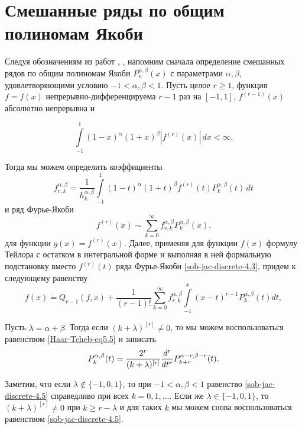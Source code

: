  \section{Смешанные ряды по общим полиномам Якоби}

 Следуя обозначениям из работ \cite{Haar-Tcheb-Shar13},   \cite{Haar-Tcheb-Shar18}, напомним сначала определение смешанных рядов по общим полиномам Якоби
 $P_n^{\alpha,\beta}(x)$ с параметрами $\alpha,\beta$, удовлетворяющими условию
$-1<\alpha,\beta<1$.  Пусть целое $r\ge1$, функция $f=f(x)$ непрерывно-дифференцируема
$r-1$ раз на $[-1,1]$, $f^{(r-1)}(x)$ абсолютно непрерывна и

\begin{equation}\label{sob-jac-discrete-4.1}
\int\limits^1_{-1}(1-x)^\alpha(1+x)^\beta\left|f^{(r)}(x)\right|\,dx<\infty.
\end{equation}

Тогда мы можем определить коэффициенты
\begin{equation}\label{sob-jac-discrete-4.2}
f^{\alpha,\beta}_{r,k}=\frac{1}{h^{\alpha,\beta}_k}\int\limits^1_{-1}(1-t)^\alpha(1+t)^\beta f^{(r)}(t)P_k^{\alpha,\beta}(t)\,dt
\end{equation}
и ряд Фурье-Якоби
\begin{equation}\label{sob-jac-discrete-4.3}
f^{(r)}(x)\sim\sum^\infty_{k=0}f^{\alpha,\beta}_{r,k}P_k^{\alpha,\beta}(x).
\end{equation}
для функции $g(x)=f^{(r)}(x)$. Далее, применяя для функции $f(x)$ формулу Тейлора с остатком в интегральной форме и
выполняя в ней формальную подстановку вместо
$f^{(r)}(t)$ ряда Фурье-Якоби \eqref{sob-jac-discrete-4.3}, придем к следующему равенству
\begin{equation}\label{sob-jac-discrete-4.4}
f(x)=Q_{r-1}(f,x)+\frac{1}{(r-1)!}
\sum^\infty_{k=0}f^{\alpha,\beta}_{r,k}
\int\limits^x_{-1}(x-t)^{r-1}P_k^{\alpha,\beta}(t)dt,
\end{equation}

Пусть $\lambda=\alpha+\beta$. Тогда если $(k+\lambda)^{[r]}\neq0$,
то мы можем воспользоваться равенством \eqref{Haar-Tcheb-eq5.5} и записать
\begin{equation}\label{sob-jac-discrete-4.5}
P^{\alpha,\beta}_k(t)={2^r \over (k+\lambda )^{[r]}}\frac{d^r}{dt^r}P_{k+r}^{\alpha-r,\beta-r}(t).
\end{equation}


Заметим, что если $\lambda\notin\{-1,0,1\}$, то при
$-1<\alpha,\beta<1$ равенство \eqref{sob-jac-discrete-4.5} справедливо при всех
$k=0,1,\ldots$. Если же $\lambda\in\{-1,0,1\}$, то
$(k+\lambda)^{[r]}\neq0$ при $k\ge r-\lambda$ и для таких $k$ мы
можем снова воспользоваться равенством \eqref{sob-jac-discrete-4.5}.

